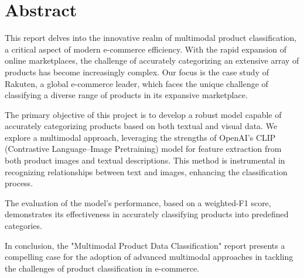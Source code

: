 \chapter*{Abstract}
\label{sec:abstract}

This report delves into the innovative realm of multimodal product classification, a critical aspect of modern e-commerce efficiency. With the rapid expansion of online marketplaces, the challenge of accurately categorizing an extensive array of products has become increasingly complex. Our focus is the case study of Rakuten, a global e-commerce leader, which faces the unique challenge of classifying a diverse range of products in its expansive marketplace.

The primary objective of this project is to develop a robust model capable of accurately categorizing products based on both textual and visual data. We explore a multimodal approach, leveraging the strengths of OpenAI's CLIP (Contrastive Language–Image Pretraining) model for feature extraction from both product images and textual descriptions. This method is instrumental in recognizing  relationships between text and images, enhancing the classification process.

The evaluation of the model's performance, based on a weighted-F1 score, demonstrates its effectiveness in accurately classifying products into predefined categories.

In conclusion, the "Multimodal Product Data Classification" report presents a compelling case for the adoption of advanced multimodal approaches in tackling the challenges of product classification in e-commerce. 



